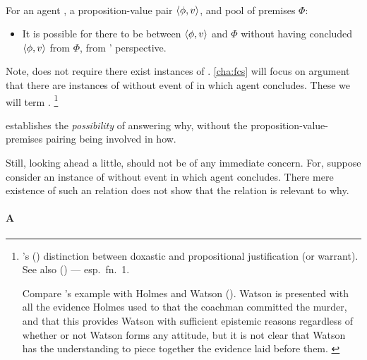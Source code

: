 \paragraph{\supportII{}}

\begin{note}
  \begin{idea}[\supportII{}]
    \label{idea:support:possible}
    For an agent \vAgent{}, a proposition-value pair \(\langle \phi, v \rangle\), and pool of premises \(\Phi\):

    \begin{itemize}
    \item
      It is possible for there to be \support{} between \(\langle \phi, v \rangle\) and \(\Phi\) without \vAgent{} having concluded \(\langle \phi, v \rangle\) from \(\Phi\), from \vAgent{}' perspective.
    \end{itemize}
    \vspace{-\baselineskip}
  \end{idea}

  Note, \supportII{} does not require there exist instances of \support{}.
  \autoref{cha:fcs} will focus on argument that there are instances of \support{} without event of in which agent concludes.
  These we will term .%
  \footnote{
    \citeauthor{Firth:1978vi}'s (\citeyear{Firth:1978vi}) distinction between doxastic and propositional justification (or warrant).
    See also \citeauthor{Silva:2020aa} (\citeyear{Silva:2020aa}) --- esp.\ fn.\ 1.

    {\color{red}
      Compare \citeauthor{Firth:1978vi}'s example with Holmes and Watson (\citeyear[218]{Firth:1978vi}).
      Watson is presented with all the evidence Holmes used to that the coachman committed the murder, and that this provides Watson with sufficient epistemic reasons regardless of whether or not Watson forms any attitude, but it is not clear that Watson has the understanding to piece together the evidence laid before them.
    }
  }

  \supportII{} establishes the \emph{possibility} of \support{} answering why, without the proposition-value-premises pairing being involved in how.

  Still, looking ahead a little, \supportII{} should not be of any immediate concern.
  For, suppose consider an instance of \support{} without event in which agent concludes.
  There mere existence of such an relation does not show that the relation is relevant to why.
\end{note}

\paragraph{A }

